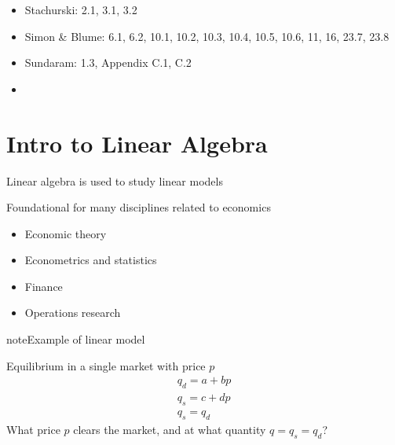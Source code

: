 \documentclass[letterpaper,10pt,english]{jupyterBook}
\begin{document}
\sphinxAtStartPar
{}
\begin{itemize}
\item {} 
\sphinxAtStartPar
Stachurski: 2.1, 3.1, 3.2

\item {} 
\sphinxAtStartPar
Simon \& Blume: 6.1, 6.2, 10.1, 10.2, 10.3, 10.4, 10.5, 10.6, 11, 16, 23.7, 23.8

\item {} 
\sphinxAtStartPar
Sundaram: 1.3, Appendix C.1, C.2

\item {} 
\sphinxAtStartPar
{\hyperref[\detokenize{05.linear_algebra:extra-study-material}]{}}

\end{itemize}


\section{Intro to Linear Algebra}
\label{\detokenize{05.linear_algebra:intro-to-linear-algebra}}
\sphinxAtStartPar
Linear algebra is used to study linear models

\sphinxAtStartPar
Foundational for many disciplines related to economics
\begin{itemize}
\item {} 
\sphinxAtStartPar
Economic theory

\item {} 
\sphinxAtStartPar
Econometrics and statistics

\item {} 
\sphinxAtStartPar
Finance

\item {} 
\sphinxAtStartPar
Operations research

\end{itemize}

\begin{sphinxadmonition}{note}{Example of linear model}

\sphinxAtStartPar
Equilibrium in a single market with price \(p\)
\begin{equation*}
\begin{split}
q_d = a + b p
\\
q_s = c + d p
\\
q_s = q_d
\end{split}
\end{equation*}
\sphinxAtStartPar
What price \(p\) clears the market, and at what quantity \(q = q_s = q_d\)?
\end{sphinxadmonition}
\end{document}
